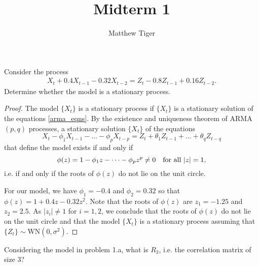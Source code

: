 \documentclass[12pt]{article}
\title{Midterm 1}
\author{Matthew Tiger}
\theoremstyle{definition}
\newenvironment{custompbm}[1]
  {\renewcommand\theproblem{#1}\problem}
  {\endproblem}
\begin{document}
\maketitle


\begin{custompbm}{1.a}
  Consider the process
  \begin{align}\label{arma_eqns}
    X_t + 0.4X_{t-1} - 0.32X_{t-2} = Z_t -0.8Z_{t-1} + 0.16 Z_{t-2}.
  \end{align}
  Determine whether the model is a stationary process.
\end{custompbm}

\begin{proof}
  The model $\{X_t\}$ is a stationary process if $\{X_t\}$ is a stationary solution
  of the equations \eqref{arma_eqns}. By the existence and uniqueness theorem
  of ARMA$(p, q)$ processes, a stationary solution $\{X_t\}$ of the equations
  \[
    X_t - \phi_1X_{t-1} - \dots - \phi_pX_{t-p} = Z_t + \theta_1Z_{t-1} + \dots + \theta_q Z_{t-q}
  \]
  that define the model exists if and only if
  \[
    \phi(z) = 1 - \phi_1 z - \dots - \phi_p z^p \neq 0 \text{\quad for all $|z| = 1,$}
  \]
  i.e. if and only if the roots of $\phi(z)$ do not lie on the unit circle.

  For our model, we have $\phi_1 = -0.4$ and $\phi_2 = 0.32$ so that $\phi(z) = 1 + 0.4z - 0.32z^2$.
  Note that the roots of $\phi(z)$ are $z_1 = -1.25$ and $z_2 = 2.5$. As $|z_i| \neq 1$ for $i=1,2$,
  we conclude that the roots of $\phi(z)$ do not lie on the unit circle and that
  the model $\{X_t\}$ is a stationary process assuming that $\{Z_t\} \sim \text{WN}(0, \sigma^2)$.
\end{proof}


\begin{custompbm}{1.b}
  Considering the model in problem 1.a, what is $R_3$, i.e. the correlation
  matrix of size 3?
\end{custompbm}
\end{document}
